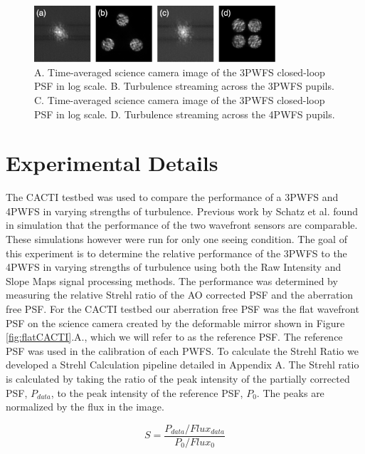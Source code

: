 
\begin{figure}
    \centering
    \includegraphics[width=0.8\textwidth]{Chapter Materials/Chapter Five Materials/turbCACTI.png}
    \caption{A. Time-averaged science camera image of the 3PWFS closed-loop PSF in log scale. B. Turbulence streaming across the 3PWFS pupils. C. Time-averaged science camera image of the 3PWFS closed-loop PSF in log scale. D. Turbulence streaming across the 4PWFS pupils.}
    \label{fig:turbCACTI}
\end{figure}


\section{Experimental Details}


The CACTI testbed was used to compare the performance of a 3PWFS and 4PWFS in varying strengths of turbulence. Previous work by Schatz et al. found in simulation that the performance of the two wavefront sensors are comparable. These simulations however were run for only one seeing condition. The goal of this experiment is to determine the relative performance of the 3PWFS to the 4PWFS in varying strengths of turbulence using both the Raw Intensity and Slope Maps signal processing methods. The performance was determined by measuring the relative Strehl ratio of the AO corrected PSF and the aberration free PSF. For the CACTI testbed our aberration free PSF was the flat wavefront PSF on the science camera created by the deformable mirror shown in Figure \ref{fig:flatCACTI}.A., which we will refer to as the reference PSF. The reference PSF was used in the calibration of each PWFS. To calculate the Strehl Ratio we developed a Strehl Calculation pipeline detailed in Appendix A. The Strehl ratio is calculated by taking the ratio of the peak intensity of the partially corrected PSF, $P_{data}$,  to the peak intensity of the reference PSF, $P_0$. The peaks are normalized by the flux in the image. 

\begin{equation}
    S=\frac{P_{data}/Flux_{data}}{P_{0}/Flux_{0}}
    \label{Strehl}
\end{equation}

